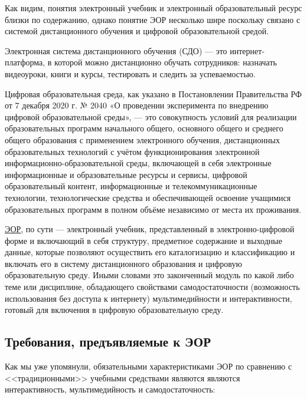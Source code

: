 Как видим, понятия электронный учебник и электронный образовательный ресурс близки по содержанию, однако понятие ЭОР несколько шире поскольку связано с системой дистанционного обучения и цифровой образовательной средой.

Электронная система дистанционного обучения (СДО) --- это интернет-платформа, в которой можно дистанционно обучать сотрудников: назначать видеоуроки, книги и курсы, тестировать и следить за успеваемостью. 

Цифровая образовательная среда, как указано в Постановлении Правительства РФ от 7 декабря 2020 г. № 2040 «О проведении эксперимента по внедрению цифровой образовательной среды», --- это совокупность условий для реализации образовательных программ начального общего, основного общего и среднего общего образования с применением электронного обучения, дистанционных образовательных технологий с учётом функционирования электронной информационно-образовательной среды, включающей в себя электронные информационные и образовательные ресурсы и сервисы, цифровой образовательный контент, информационные и телекоммуникационные технологии, технологические средства и обеспечивающей освоение учащимися образовательных программ в полном объёме независимо от места их проживания.

\hyperref[task1]{ЭОР}, по сути ---  электронный учебник,  представленный в электронно-цифровой форме и включающий в себя структуру, предметное содержание и выходные данные, которые позволяют осуществить его каталогизацию и классификацию и включать его в систему дистанционного образования и цифровую образовательную среду\cite{gost}. Иными словами это законченный модуль по какой либо теме или дисциплине, обладающего свойствами самодостаточности (возможность использования без доступа к интернету) мультимедийности и интерактивности, готовый для включения в цифровую образовательную среду.


\subsection{Требования, предъявляемые к ЭОР}
Как мы уже упомянули, обязательными характеристиками ЭОР по сравнению с <<традиционными>> учебными средствами являются  являются интерактивность, мультимедийность и самодостаточность: 

